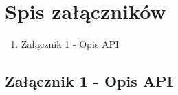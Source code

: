 \documentclass[a4paper,11pt,twoside]{report}
\theoremstyle{definition}
\begin{document}
\listoffigures
\thispagestyle{empty}


\renewcommand{\listtablename}{Spis tabel}
\listoftables
\thispagestyle{empty}




\chapter*{Spis załączników}
\begin{enumerate}[itemsep = 0pt]
\item Załącznik 1 - Opis API
\end{enumerate}
\thispagestyle{empty}


\newpage
\pagestyle{empty} 
\section{Załącznik 1 - Opis API}

\end{document}
